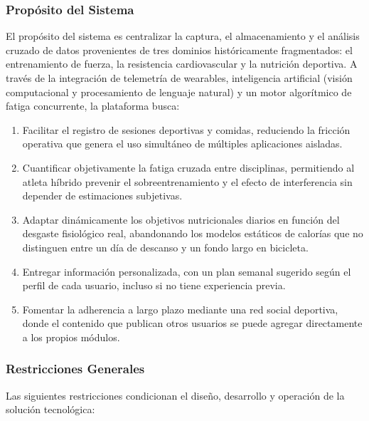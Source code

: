 \subsubsection{Propósito del Sistema}
El propósito del sistema es centralizar la captura, el almacenamiento y el análisis cruzado de datos provenientes de tres dominios históricamente fragmentados: el entrenamiento de fuerza, la resistencia cardiovascular y la nutrición deportiva. A través de la integración de telemetría de wearables, inteligencia artificial (visión computacional y procesamiento de lenguaje natural) y un motor algorítmico de fatiga concurrente, la plataforma busca:
\begin{enumerate}
    \item Facilitar el registro de sesiones deportivas y comidas, reduciendo la fricción operativa que genera el uso simultáneo de múltiples aplicaciones aisladas.
    \item Cuantificar objetivamente la fatiga cruzada entre disciplinas, permitiendo al atleta híbrido prevenir el sobreentrenamiento y el efecto de interferencia sin depender de estimaciones subjetivas.
    \item Adaptar dinámicamente los objetivos nutricionales diarios en función del desgaste fisiológico real, abandonando los modelos estáticos de calorías que no distinguen entre un día de descanso y un fondo largo en bicicleta.
    \item Entregar información personalizada, con un plan semanal sugerido según el perfil de cada usuario, incluso si no tiene experiencia previa.
    \item Fomentar la adherencia a largo plazo mediante una red social deportiva, donde el contenido que publican otros usuarios se puede agregar directamente a los propios módulos.
\end{enumerate}
\subsubsection{Restricciones Generales}
Las siguientes restricciones condicionan el diseño, desarrollo y operación de la solución tecnológica:

